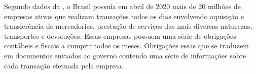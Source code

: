 \newcommand{\comando}[1]{\textbf{$\backslash$#1}}

Segundo dados da , o Brasil possuía em abril de 2020 mais de 20 milhões de empresas ativas que realizam transações todos os dias envolvendo aquisição e transferência de mercadorias, prestação de serviços das mais diversas naturezas, transportes e devoluções. Essas empresas possuem uma série de obrigações contábeis e fiscais a cumprir todos os meses. Obrigações essas que se traduzem em documentos enviados ao governo contendo uma série de informações sobre cada transação efetuada pela empresa.










